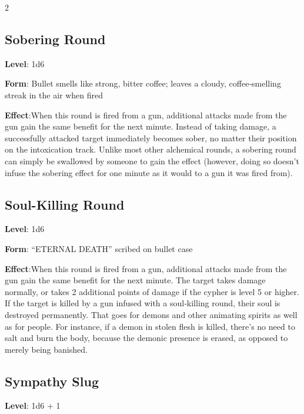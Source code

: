 \begin{multicols}{2}
\subsection{Sobering Round}

\textbf{Level}: 1d6 

\textbf{Form}: Bullet smells like strong, bitter coffee; leaves a cloudy, coffee‑smelling streak in the air when fired 

\textbf{Effect}:When this round is fired from a gun, additional attacks made from the gun gain the same benefit for the next minute. Instead of taking damage, a successfully attacked target immediately becomes sober, no matter their position on the intoxication track. 
Unlike most other alchemical rounds, a sobering round can simply be swallowed by someone to gain the effect (however, doing so doesn’t infuse the sobering effect for one minute as it would to a gun it was fired from). 

\subsection{Soul-Killing Round}

\textbf{Level}: 1d6 

\textbf{Form}: “ETERNAL DEATH” scribed on bullet case 

\textbf{Effect}:When this round is fired from a gun, additional attacks made from the gun gain the same benefit for the next minute. The target takes damage normally, or takes 2 additional points of damage if the cypher is level 5 or higher. If the target is killed by a gun infused with a soul‑killing round, their soul is destroyed permanently. That goes for demons and other animating spirits as well as for people. For instance, if a demon in stolen flesh is killed, there’s no need to salt and burn the body, because the demonic presence is erased, as opposed to merely being banished. 

\subsection{Sympathy Slug}

\textbf{Level}: 1d6 + 1 


\end{multicols}
